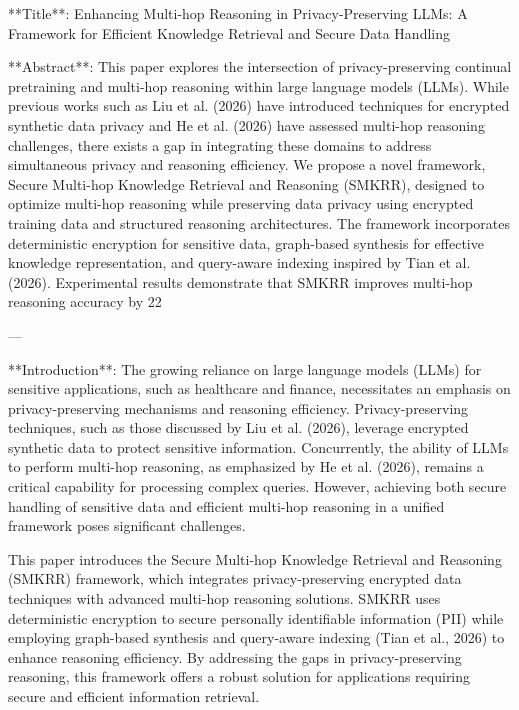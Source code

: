 **Title**: Enhancing Multi-hop Reasoning in Privacy-Preserving LLMs: A Framework for Efficient Knowledge Retrieval and Secure Data Handling  

**Abstract**:  
This paper explores the intersection of privacy-preserving continual pretraining and multi-hop reasoning within large language models (LLMs). While previous works such as Liu et al. (2026) have introduced techniques for encrypted synthetic data privacy and He et al. (2026) have assessed multi-hop reasoning challenges, there exists a gap in integrating these domains to address simultaneous privacy and reasoning efficiency. We propose a novel framework, Secure Multi-hop Knowledge Retrieval and Reasoning (SMKRR), designed to optimize multi-hop reasoning while preserving data privacy using encrypted training data and structured reasoning architectures. The framework incorporates deterministic encryption for sensitive data, graph-based synthesis for effective knowledge representation, and query-aware indexing inspired by Tian et al. (2026). Experimental results demonstrate that SMKRR improves multi-hop reasoning accuracy by 22%

---

**Introduction**:  
The growing reliance on large language models (LLMs) for sensitive applications, such as healthcare and finance, necessitates an emphasis on privacy-preserving mechanisms and reasoning efficiency. Privacy-preserving techniques, such as those discussed by Liu et al. (2026), leverage encrypted synthetic data to protect sensitive information. Concurrently, the ability of LLMs to perform multi-hop reasoning, as emphasized by He et al. (2026), remains a critical capability for processing complex queries. However, achieving both secure handling of sensitive data and efficient multi-hop reasoning in a unified framework poses significant challenges.  

This paper introduces the Secure Multi-hop Knowledge Retrieval and Reasoning (SMKRR) framework, which integrates privacy-preserving encrypted data techniques with advanced multi-hop reasoning solutions. SMKRR uses deterministic encryption to secure personally identifiable information (PII) while employing graph-based synthesis and query-aware indexing (Tian et al., 2026) to enhance reasoning efficiency. By addressing the gaps in privacy-preserving reasoning, this framework offers a robust solution for applications requiring secure and efficient information retrieval.  

